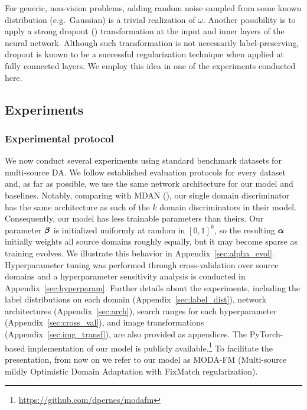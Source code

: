 For generic, non-vision problems, adding random noise sampled from some known distribution (e.g.\ Gaussian) is a trivial realization of $\omega$. Another possibility is to apply a strong dropout (\citet{Srivastava2014}) transformation at the input and inner layers of the neural network. Although such transformation is not necessarily label-preserving, dropout is known to be a successful regularization technique when applied at fully connected layers. We employ this idea in one of the experiments conducted here.

\subsection{Experiments}
\label{sec:modafm_experiments}

\subsubsection{Experimental protocol}
We now conduct several experiments using standard benchmark datasets for multi-source DA. We follow established evaluation protocols for every dataset and, as far as possible, we use the same network architecture for our model and baselines. Notably, comparing with MDAN (\citet{Zhao2018}), our single domain discriminator has the same architecture as each of the $k$ domain discriminators in their model. Consequently, our model has less trainable parameters than theirs. Our parameter ${\bm{\beta}}$ is initialized uniformly at random in $[0,1]^k$, so the resulting ${\bm{\alpha}}$ initially weights all source domains roughly equally, but it may become sparse as training evolves. We illustrate this behavior in Appendix~\ref{sec:alpha_evol}. Hyperparameter tuning was performed through cross-validation over source domains and a hyperparameter sensitivity analysis is conducted in Appendix~\ref{sec:hyperparam}. Further details about the experiments, including the label distributions on each domain (Appendix~\ref{sec:label_dist}), network architectures (Appendix~\ref{sec:arch}), search ranges for each hyperparameter (Appendix~\ref{sec:cross_val}), and image transformations (Appendix~\ref{sec:img_transf}), are also provided as appendices. The PyTorch-based implementation of our model is publicly available.\footnote{\url{https://github.com/dpernes/modafm}} To facilitate the presentation, from now on we refer to our model as MODA-FM (Multi-source mildly Optimistic Domain Adaptation with FixMatch regularization).

